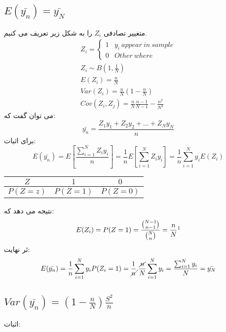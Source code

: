 \subsection*{$E(\bar{y_n})=\bar{y_N}$}
متغییر تصادفی 
$Z_i$
را به شکل زیر تعریف می کنیم.
\begin{gather*}
	Z_i=
	\begin{cases}
		1 & y_i~appear~in~sample\\
		0 & Other~where
	\end{cases} \\
	Z_i\sim B(1,\frac{1}{N}) \\
	E(Z_i)=\frac{n}{N} \\
	Var(Z_i)=\frac{n}{N}(1-\frac{n}{N})\\
	Cov(Z_i,Z_j)=\frac{n}{N}\frac{n-1}{N-1}-\frac{n^2}{N^2}
\end{gather*}
می توان گفت که:
\begin{equation*}
	\bar{y_n}=\frac{Z_1y_1+Z_2y_2+\dots+Z_Ny_N}{n}
\end{equation*}
برای اثبات:
\begin{equation*}
	E(\bar{y_n})=E[\frac{\sum_{i=1}^{N}Z_iy_i}{n}]
	=\frac{1}{n}E[\sum_{i=1}^{N}Z_iy_i]
	=\frac{1}{n}\sum_{i=1}^{N}y_iE(Z_i)
\end{equation*}
\begin{LTR}
	\begin{tabular}{c|cc}
		$Z$ & $1$ & $0$ \\ 
		\hline 
		$P(Z=z)$ & $P(Z=1)$ & $P(Z=0)$
	\end{tabular}
\end{LTR}
نتیجه می دهد که:
\begin{equation*}
	E(Z_i)=P(Z=1)=\frac{\binom{N-1}{n-1}}{\binom{N}{n}}=\frac{n}{N}
	\footnotemark
\end{equation*}
ئر نهایت:
\begin{equation*}
	E(\bar{y_n})=\frac{1}{n}\sum_{i=1}^{N}y_iP(Z_i=1)
	=\frac{1}{\cancel{n}}.\frac{\cancel{n}}{N}\sum_{i=1}^{N}y_i
	=\frac{\sum_{i=1}^{N}y_i}{N}=\bar{y_N}
\end{equation*}
\subsection*{$Var(\bar{y_n})=(1-\frac{n}{N})\frac{S^2}{n}$}
اثبات:

